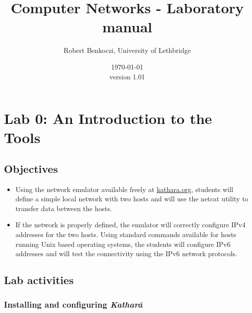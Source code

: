 \documentclass[12pt]{book}
\title{Computer Networks - Laboratory manual}    %
\author{Robert Benkoczi, University of Lethbridge}    %
\date{\today\\ version 1.01}  %
\newcommand{\kathara}{Kathar\'a}
\begin{document}
\frontmatter                            %
\maketitle    
\doclicenseThis                      
\tableofcontents                        %

\mainmatter %

\chapter{Lab 0: An Introduction to the Tools }

\section{Objectives}

\begin{itemize}[--]
\item Using the network emulator available freely at
  \url{kathara.org}, students will define a simple local network with
  two hosts and
  will use the netcat utility to transfer data between the hosts.

\item If the network is properly defined, the emulator will correctly
  configure IPv4 addresses for the two hosts. Using standard commands
  available for hosts running Unix based operating systems, the
  students will configure IPv6 addresses and will test the
  connectivity using the IPv6 network protocols.

\end{itemize}


\section{Lab activities}
\subsection{Installing and configuring \emph{\kathara}}
\end{document}
